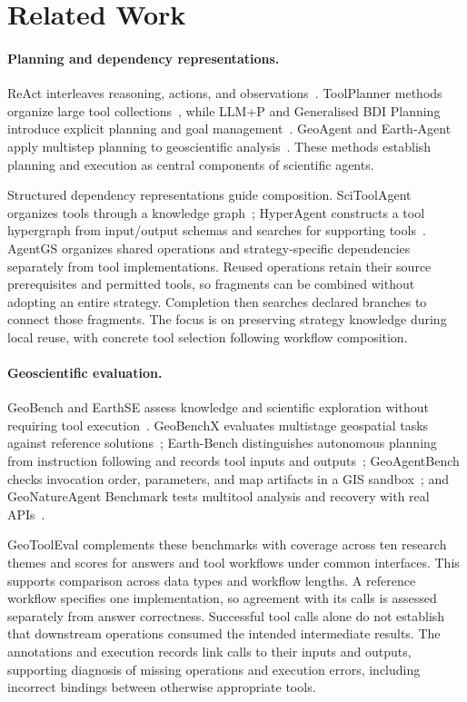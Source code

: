 \section{Related Work}
\label{sec:related-work}
\paragraph{Planning and dependency representations.}
ReAct interleaves reasoning, actions, and observations~\cite{yao2023react}. ToolPlanner methods organize large tool collections~\cite{wu2024toolplanner,liu2025toolplanner}, while LLM+P and Generalised BDI Planning introduce explicit planning and goal management~\cite{liu2023llmp,meneguzzi2025bdi}. GeoAgent and Earth-Agent apply multistep planning to geoscientific analysis~\cite{chen2024geoagent,feng2026earthagent}. These methods establish planning and execution as central components of scientific agents.

Structured dependency representations guide composition. SciToolAgent organizes tools through a knowledge graph~\cite{ding2025scitoolagent}; HyperAgent constructs a tool hypergraph from input/output schemas and searches for supporting tools~\cite{zhai2026hyperagent}. AgentGS organizes shared operations and strategy-specific dependencies separately from tool implementations. Reused operations retain their source prerequisites and permitted tools, so fragments can be combined without adopting an entire strategy. Completion then searches declared branches to connect those fragments. The focus is on preserving strategy knowledge during local reuse, with concrete tool selection following workflow composition.

\paragraph{Geoscientific evaluation.}
GeoBench and EarthSE assess knowledge and scientific exploration without requiring tool execution~\cite{deng2023k2,xu2025earthse}. GeoBenchX evaluates multistage geospatial tasks against reference solutions~\cite{krechetova2025geobenchx}; Earth-Bench distinguishes autonomous planning from instruction following and records tool inputs and outputs~\cite{feng2026earthagent}; GeoAgentBench checks invocation order, parameters, and map artifacts in a GIS sandbox~\cite{yu2026geoagentbench}; and GeoNatureAgent Benchmark tests multitool analysis and recovery with real APIs~\cite{diazireland2026geonatureagent}.

GeoToolEval complements these benchmarks with coverage across ten research themes and scores for answers and tool workflows under common interfaces. This supports comparison across data types and workflow lengths. A reference workflow specifies one implementation, so agreement with its calls is assessed separately from answer correctness. Successful tool calls alone do not establish that downstream operations consumed the intended intermediate results. The annotations and execution records link calls to their inputs and outputs, supporting diagnosis of missing operations and execution errors, including incorrect bindings between otherwise appropriate tools.
